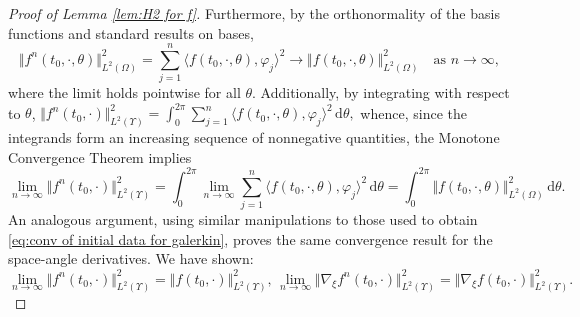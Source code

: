 \documentclass[11pt,a4paper,reqno]{amsart}
\theoremstyle{remark}
\theoremstyle{definition}
\numberwithin{equation}{section}
\newcommand{\bxi}{\xi}
\renewcommand{\d}{\, \mathrm{d} }
\begin{document}
\begin{proof}[Proof of Lemma \ref{lem:H2 for f}]
Furthermore, by the orthonormality of the basis functions and standard results on bases, 
\begin{equation*}
    \Vert f^n(t_0,\cdot,\theta) \Vert^2_{L^2(\Omega)} = \sum_{j=1}^n \langle f(t_0,\cdot,\theta) , \varphi_j \rangle^2 \longrightarrow \Vert f(t_0,\cdot,\theta) \Vert^2_{L^2(\Omega)} \quad \text{as } n \to\infty, 
\end{equation*}
where the limit holds pointwise for all $\theta$. Additionally, by integrating with respect to $\theta$, $\Vert f^n(t_0,\cdot) \Vert^2_{L^2(\Upsilon)} = \int_0^{2\pi} \sum_{j=1}^n \langle f(t_0,\cdot,\theta) , \varphi_j \rangle^2 \d \theta,$ whence, since the integrands form an increasing sequence of nonnegative quantities, the Monotone Convergence Theorem implies 
\begin{equation*}
   \lim_{n\to\infty}\Vert f^n(t_0,\cdot) \Vert^2_{L^2(\Upsilon)} = \int_0^{2\pi} \lim_{n\to\infty} \sum_{j=1}^n \langle f(t_0,\cdot,\theta) , \varphi_j \rangle^2 \d \theta = \int_0^{2\pi} \Vert f(t_0,\cdot,\theta) \Vert^2_{L^2(\Omega)} \d \theta. 
\end{equation*}
An analogous argument, using similar manipulations to those used to obtain \eqref{eq:conv of initial data for galerkin}, proves the same convergence result for the space-angle derivatives. We have shown: 
\begin{equation}\label{eq:conv initial data galerkin f}
    \lim_{n\to\infty}\Vert f^n(t_0,\cdot) \Vert^2_{L^2(\Upsilon)} = \Vert f(t_0,\cdot) \Vert^2_{L^2(\Upsilon)}, \, \lim_{n\to\infty}\Vert \nabla_{\bxi} f^n(t_0,\cdot) \Vert^2_{L^2(\Upsilon)} = \Vert \nabla_{\bxi} f(t_0,\cdot) \Vert^2_{L^2(\Upsilon)}. 
\end{equation}





    \smallskip 


\end{proof}
\end{document}
